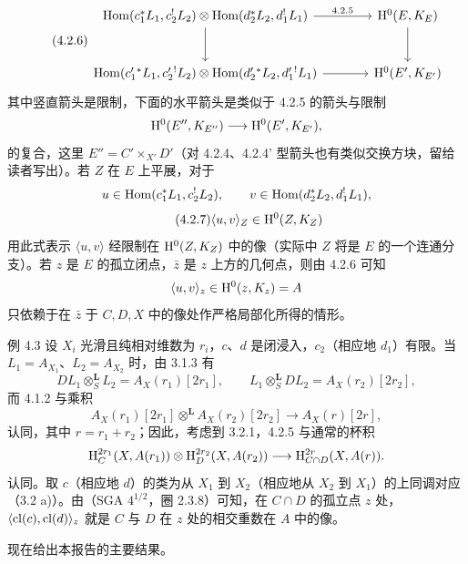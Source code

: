 \begin{equation}
\tag{4.2.6}
\begin{tikzcd}[column sep=large,row sep=large]
\Hom(c_1^*L_1,c_2^!L_2)\otimes\Hom(d_2^*L_2,d_1^!L_1)
  \arrow[r,"4.2.5"] \arrow[d] &
\H^0(E,K_E)\arrow[d] \\
\Hom(c_1'{}^*L_1,c_2'{}^!L_2)\otimes\Hom(d_2'{}^*L_2,d_1'{}^!L_1)
  \arrow[r] &
\H^0(E',K_{E'})
\end{tikzcd}
\end{equation}
其中竖直箭头是限制，下面的水平箭头是类似于 4.2.5 的箭头与限制
\[
\mathrm{H}^0(E'',K_{E''})\longrightarrow \mathrm{H}^0(E',K_{E'}),
\]
的复合，这里 $E''=C'\times_{X'}D'$（对 4.2.4、4.2.4' 型箭头也有类似交换方块，留给读者写出）。若 $Z$ 在 $E$ 上平展，对于
\[
u\in\operatorname{Hom}(c_1^*L_1,c_2^!L_2),\qquad
v\in\operatorname{Hom}(d_2^*L_2,d_1^!L_1),
\]
\begin{equation}
\tag{4.2.7}
\langle u,v\rangle_Z\in \mathrm{H}^0(Z,K_Z)
\end{equation}
用此式表示 $\langle u,v\rangle$ 经限制在 $\mathrm{H}^0(Z,K_Z)$ 中的像（实际中 $Z$ 将是 $E$ 的一个连通分支）。若 $z$ 是 $E$ 的孤立闭点，$\bar z$ 是 $z$ 上方的几何点，则由 4.2.6 可知
\[
\langle u,v\rangle_z\in \mathrm{H}^0(z,K_z)=A
\]
只依赖于在 $\bar z$ 于 $C,D,X$ 中的像处作严格局部化所得的情形。

\begin{statement}{例 4.3}
设 $X_i$ 光滑且纯相对维数为 $r_i$，$c$、$d$ 是闭浸入，$c_2$（相应地 $d_1$）有限。当 $L_1=A_{X_1}$、$L_2=A_{X_2}$ 时，由 3.1.3 有
\[
DL_1\otimes_S^{\mathbf L}L_2=A_X(r_1)[2r_1],\qquad
L_1\otimes_S^{\mathbf L}DL_2=A_X(r_2)[2r_2],
\]
而 4.1.2 与乘积
\[
A_X(r_1)[2r_1]\otimes^{\mathbf L}A_X(r_2)[2r_2]\longrightarrow A_X(r)[2r],
\]
认同，其中 $r=r_1+r_2$；因此，考虑到 3.2.1，4.2.5 与通常的杯积
\[
\mathrm{H}_C^{2r_1}(X,A(r_1))\otimes \mathrm{H}_D^{2r_2}(X,A(r_2))
\longrightarrow
\mathrm{H}_{C\cap D}^{2r}(X,A(r)).
\]
认同。取 $c$（相应地 $d$）的类为从 $X_1$ 到 $X_2$（相应地从 $X_2$ 到 $X_1$）的上同调对应（3.2 a)）。由（SGA $4^{1/2}$，圈 2.3.8）可知，在 $C\cap D$ 的孤立点 $z$ 处，$\langle \operatorname{cl}(c),\operatorname{cl}(d)\rangle_z$ 就是 $C$ 与 $D$ 在 $z$ 处的相交重数在 $A$ 中的像。
\end{statement}

现在给出本报告的主要结果。

